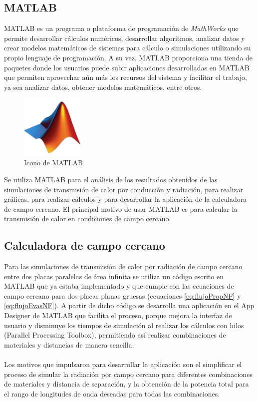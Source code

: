 \subsection{MATLAB}
MATLAB es un programa o plataforma de programación de \textit{MathWorks} que permite desarrollar cálculos numéricos, desarrollar algoritmos, analizar datos y crear modelos matemáticos de sistemas para cálculo o simulaciones utilizando su propio lenguaje de programación. A su vez, MATLAB proporciona una tienda de paquetes donde los usuarios puede subir aplicaciones desarrolladas en MATLAB que permiten aprovechar aún más los recursos del sistema y facilitar el trabajo, ya sea analizar datos, obtener modelos matemáticos, entre otros.\\
\begin{figure}[H]
	\centering
		\includegraphics[width=3cm]{figuras/MatlabIcon.png}
	\caption{Icono de MATLAB}
	\label{fig:MatlabIcon}
\end{figure}
Se utiliza MATLAB para el análisis de los resultados obtenidos de las simulaciones de transmisión de calor por conducción y radiación, para realizar gráficas, para realizar cálculos y para desarrollar la aplicación de la calculadora de campo cercano. El principal motivo de usar MATLAB es para calcular la transmisión de calor en condiciones de campo cercano.

\subsection{Calculadora de campo cercano}
Para las simulaciones de transmisión de calor por radiación de campo cercano entre dos placas paralelas de área infinita se utiliza un código escrito en MATLAB que ya estaba implementado y que cumple con las ecuaciones de campo cercano para dos placas planas gruesas (ecuaciones \eqref{eq:flujoPropNF} y \eqref{eq:flujoEvasNF}). A partir de dicho código se desarrolla una aplicación en el App Designer de MATLAB que facilita el proceso, porque mejora la interfaz de usuario y disminuye los tiempos de simulación al realizar los cálculos con hilos (Parallel Processing Toolbox), permitiendo así realizar combinaciones de materiales y distancias de manera sencilla.\\\\
Los motivos que impulsaron para desarrollar la aplicación son el simplificar el proceso de simular la radiación por campo cercano para diferentes combinaciones de materiales y distancia de separación, y la obtención de la potencia total para el rango de longitudes de onda deseadas para todas las combinaciones.\\


